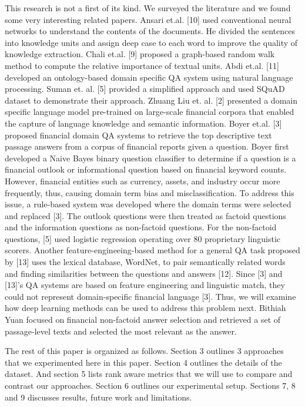 \documentclass[11pt,a4paper]{article}
\begin{document}
This research is not a first of its kind. We surveyed the literature and we found some very interesting related papers. Ansari et.al. [10] used conventional neural networks to understand the contents of the documents. He divided the sentences into knowledge units and assign deep case to each word to improve the quality of knowledge extraction. Chali et.al. [9] proposed a graph-based random walk method to compute the relative importance of textual units. Abdi et.al. [11] developed an ontology-based domain specific QA system using natural language processing. Suman et. al. [5] provided a simplified approach and used SQuAD dataset to demonstrate their approach. Zhuang Liu et. al. [2] presented a domain specific language model pre-trained on large-scale financial corpora that enabled the capture of language knowledge and semantic information. Boyer et.al. [3] proposed financial domain QA systems to retrieve the top descriptive text passage answers from a corpus of financial reports given a question. Boyer first developed a Naive Bayes binary question classifier to determine if a question is a financial outlook or informational question based on financial keyword counts. However, financial entities such as currency, assets, and industry occur more frequently, thus, causing domain term bias and misclassification. To address this issue, a rule-based system was developed where the domain terms were selected and replaced [3]. The outlook questions were then treated as factoid questions and the information questions as non-factoid questions. For the non-factoid questions, [5] used logistic regression operating over 80 proprietary linguistic scorers. Another feature-engineeing-based method for a general QA task proposed by [13] uses the lexical database, WordNet, to pair semantically related words and finding similarities between the questions and answers [12]. Since [3] and [13]’s QA systems are based on feature engineering and linguistic match, they could not represent domain-specific financial language [3]. Thus, we will examine how deep learning methods can be used to address this problem next. Bithiah Yuan focused on financial non-factoid answer selection and retrieved a  set of passage-level texts and selected the most relevant as the answer. 

 The rest of this paper is organized as follows. Section 3 outlines 3 approaches that we experimented here in this paper. Section 4 outlines the details of the dataset. And section 5 lists rank aware metrics that we will use to compare and contrast our approaches. Section 6 outlines our experimental setup. Sections 7, 8 and 9 discusses results, future work and limitations.
\end{document}
